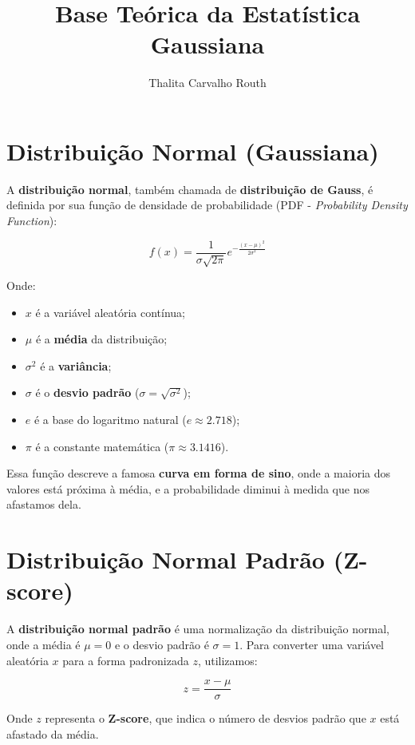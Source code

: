 \documentclass{article}
\title{Base Teórica da Estatística Gaussiana}
\author{Thalita Carvalho Routh}
\date{}
\begin{document}
\maketitle

\section{Distribuição Normal (Gaussiana)}
A \textbf{distribuição normal}, também chamada de \textbf{distribuição de Gauss}, é definida por sua função de densidade de probabilidade (PDF - \textit{Probability Density Function}):

\begin{equation}
    f(x) = \frac{1}{\sigma \sqrt{2\pi}} e^{-\frac{(x - \mu)^2}{2\sigma^2}}
\end{equation}

Onde:
\begin{itemize}
    \item $ x $ é a variável aleatória contínua;
    \item $ \mu $ é a \textbf{média} da distribuição;
    \item $ \sigma^2 $ é a \textbf{variância};
    \item $ \sigma $ é o \textbf{desvio padrão} ($ \sigma = \sqrt{\sigma^2} $);
    \item $ e $ é a base do logaritmo natural ($ e \approx 2.718 $);
    \item $ \pi $ é a constante matemática ($ \pi \approx 3.1416 $).
\end{itemize}

Essa função descreve a famosa \textbf{curva em forma de sino}, onde a maioria dos valores está próxima à média, e a probabilidade diminui à medida que nos afastamos dela.

\section{Distribuição Normal Padrão (Z-score)}
A \textbf{distribuição normal padrão} é uma normalização da distribuição normal, onde a média é $ \mu = 0 $ e o desvio padrão é $ \sigma = 1 $. Para converter uma variável aleatória $ x $ para a forma padronizada $ z $, utilizamos:

\begin{equation}
    z = \frac{x - \mu}{\sigma}
\end{equation}

Onde $ z $ representa o \textbf{Z-score}, que indica o número de desvios padrão que $ x $ está afastado da média.
\end{document}
